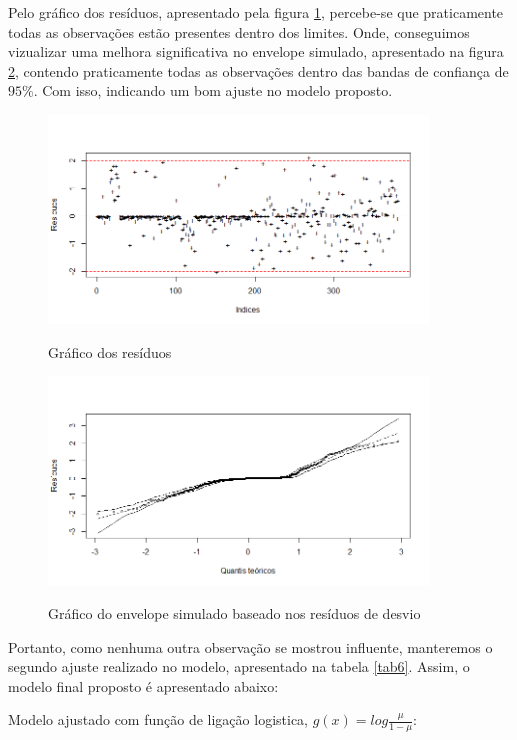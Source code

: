 \documentclass[a4paper]{article}
\begin{document}
Pelo gráfico dos resíduos, apresentado pela figura \ref{fig:res2}, percebe-se que praticamente todas as observações estão presentes dentro dos limites. Onde, conseguimos vizualizar uma melhora significativa no envelope simulado, apresentado na figura \ref{fig:es2}, contendo praticamente todas as observações dentro das bandas de confiança de $95\%$. Com isso, indicando um bom ajuste no modelo proposto. 
\begin{figure}[H] 
    \centering %
    \caption{Gráfico dos resíduos}
    \includegraphics[width=0.9\textwidth]{imagens/Res2.png}
    \label{fig:res2}
\end{figure}


\begin{figure}[H] 
    \centering %
    \caption{Gráfico do envelope simulado baseado nos resíduos de desvio}
    \includegraphics[width=0.9\textwidth]{imagens/ES2.png}
    \label{fig:es2}
\end{figure}
Portanto, como nenhuma outra observação se mostrou influente, manteremos o segundo ajuste realizado no modelo, apresentado na tabela \ref{tab6}. Assim, o modelo final proposto é apresentado abaixo:

Modelo ajustado com função de ligação logistica, $g(x) = log\frac{\mu}{1-\mu}$: 
\end{document}
